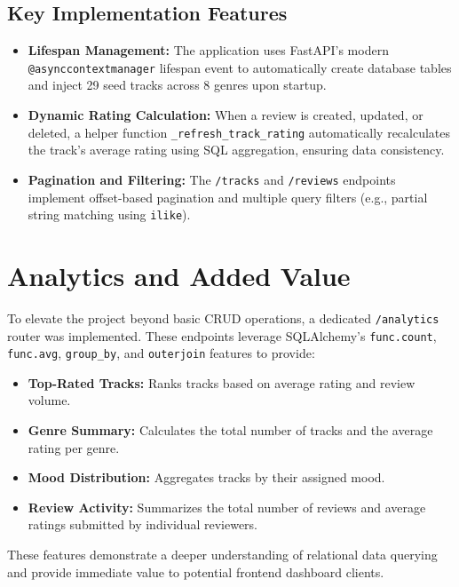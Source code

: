 \documentclass[11pt,a4paper]{article}
\begin{document}
\subsection{Key Implementation Features}
\begin{itemize}[label=\textcolor{primary}{\textbullet}, noitemsep]
    \item \textbf{Lifespan Management:} The application uses FastAPI's modern \texttt{@asynccontextmanager} lifespan event to automatically create database tables and inject 29 seed tracks across 8 genres upon startup.
    \item \textbf{Dynamic Rating Calculation:} When a review is created, updated, or deleted, a helper function \texttt{\_refresh\_track\_rating} automatically recalculates the track's average rating using SQL aggregation, ensuring data consistency.
    \item \textbf{Pagination and Filtering:} The \texttt{/tracks} and \texttt{/reviews} endpoints implement offset-based pagination and multiple query filters (e.g., partial string matching using \texttt{ilike}).
\end{itemize}

\section{Analytics and Added Value}

To elevate the project beyond basic CRUD operations, a dedicated \texttt{/analytics} router was implemented. These endpoints leverage SQLAlchemy's \texttt{func.count}, \texttt{func.avg}, \texttt{group\_by}, and \texttt{outerjoin} features to provide:
\begin{itemize}[label=\textcolor{primary}{\textbullet}, noitemsep]
    \item \textbf{Top-Rated Tracks:} Ranks tracks based on average rating and review volume.
    \item \textbf{Genre Summary:} Calculates the total number of tracks and the average rating per genre.
    \item \textbf{Mood Distribution:} Aggregates tracks by their assigned mood.
    \item \textbf{Review Activity:} Summarizes the total number of reviews and average ratings submitted by individual reviewers.
\end{itemize}

These features demonstrate a deeper understanding of relational data querying and provide immediate value to potential frontend dashboard clients.
\end{document}
